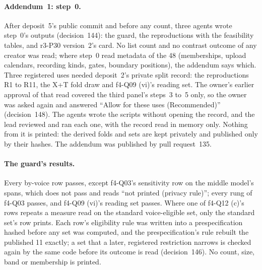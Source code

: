 \paragraph{Addendum~1: step~0.} After deposit~5's public commit and before any count, three agents wrote step~0's outputs
(decision~144): the guard, the reproductions with the feasibility tables, and r3-P30 version~2's card. No list count and
no contrast outcome of any creator was read; where step~0 read metadata of the 48 (memberships, upload calendars,
recording kinds, gates, boundary positions), the addendum says which. Three registered uses needed deposit~2's private
split record: the reproductions R1 to R11, the X+T fold draw and f4-Q09 (vi)'s reading set. The owner's earlier approval
of that read covered the third panel's steps~3 to~5 only, so the owner was asked again and answered ``Allow for these
uses (Recommended)'' (decision~148). The agents wrote the scripts without opening the record, and the lead reviewed and
ran each one, with the record read in memory only. Nothing from it is printed: the derived folds and sets are kept
privately and published only by their hashes. The addendum was published by pull request~135.

\paragraph{The guard's results.} Every by-voice row passes, except f4-Q03's sensitivity row on the middle model's spans,
which does not pass and reads ``not printed (privacy rule)''; every rung of f4-Q03 passes, and f4-Q09 (vi)'s reading set
passes. Where one of f4-Q12 (c)'s rows repeats a measure read on the standard voice-eligible set, only the standard set's
row prints. Each row's eligibility rule was written into a prespecification hashed before any set was computed, and
the prespecification's rule rebuilt the published 11 exactly; a set that a later, registered restriction narrows is checked again by the same code before its outcome is read
(decision~146). No count, size, band or membership is printed.

